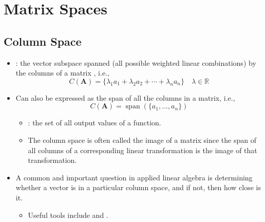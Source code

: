 \chapter{Matrix Spaces}\label{Matrix Spaces}
\section{Column Space}\label{Column Space}
\begin{itemize}
  \item {}: the vector subspace spanned (all possible weighted linear combinations) by the columns of a matrix , i.e.,
  \[%
  C(\bm{A})=\{\lambda_1a_1 + \lambda_2a_2 + \cdots + \lambda_n a_n\}\quad \lambda\in \mathbb{R}  
  \]%
  \item Can also be expressed as the span of all the columns in a matrix, i.e.,
  \[%
  C(\bm{A})= \operatorname{span}(\{a_1,\dots,a_n\})
  \]%
    \begin{itemize}
      \item {}: the set of all output values of a function. 
      \item The column space is often called the image of a matrix since the span of all columns of a corresponding linear transformation is the image of that  transformation.
    \end{itemize}
  \item A common and important question in applied linear algebra is determining whether a vector is in a particular column space, and if not, then how close is it.
    \begin{itemize}
      \item Useful tools include \hyperref[Gaussian Elimination]{} and \hyperref[Least-Squares and Model-Fitting]{}.
    \end{itemize}


\end{itemize}
